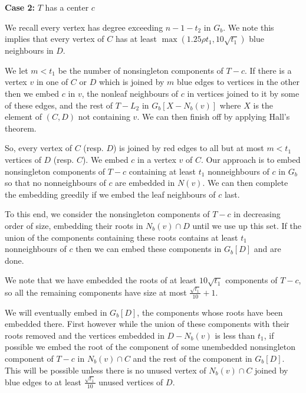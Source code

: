\documentclass[11pt]{article}
\begin{document}
 

{\bf Case 2:} $T$ has a center $c$


We recall every vertex has degree exceeding $n-1-t_2$ in $G_b$. We note this implies that every vertex of $C$ 
has at least $\max(1.25\rho t_1, 10\sqrt{t_1})$ blue neighbours in $D$. 

We let $m<t_1$ be the number of nonsingleton components of $T-c$. If there is a vertex $v$  in one of $C$
or $D$ which is joined by $m$ blue edges to vertices in the other  then we embed $c$ in $v$, 
the nonleaf neighbours of $c$ in vertices joined to it by some of these edges, 
and the rest of $T-L_2$  in $G_b[X-N_b(v)]$ where $X$ is the element of $(C,D)$ not containing $v$. 
We can then finish off by applying Hall's theorem.  

So, every vertex of $C$ (resp. $D$) is joined by red edges to  all but at most $m<t_1$ vertices  of $D$ (resp. $C$). We embed $c$ in a vertex  $v$ of $C$. Our approach is to embed nonsingleton components of $T-c$  containing at least $t_1$ nonneighbours of $c$  in $G_b$  so that 
no nonneighbours of $c$ are embedded in $N(v)$.   We can then complete the embedding greedily if we embed the leaf neighbours of 
$c$ last. 

To this end, we consider the nonsingleton components of $T-c$ in decreasing order 
of size, embedding their roots in $N_b(v) \cap D$ until we use up this set.
If  the union of the components containing these roots contains  at least $t_1$ nonneighbours of $c$ then  we can embed these components  in $G_b[D]$ and are done. 


We note that we have embedded the roots of at least $10 \sqrt{t_1}$ components of $T-c$,
so all the remaining components have size at most $\frac{\sqrt{t_1}}{10}+1$.

We will eventually  embed  in $G_b[D]$, the components whose roots have been  embedded there. First however
while  the union of these components with their roots removed and the vertices embedded in $D-N_b(v)$ is
less than $t_1$, if possible we embed the root of the component of some unembedded 
nonsingleton component of $T-c$ in $N_b(v) \cap C$ and the rest of the component in $G_b[D]$.
This will be possible unless  there is no unused vertex of $N_b(v) \cap C$  joined by blue edges 
to at least $\frac{\sqrt{t_1}}{10}$ unused vertices of $D$.
\end{document}
